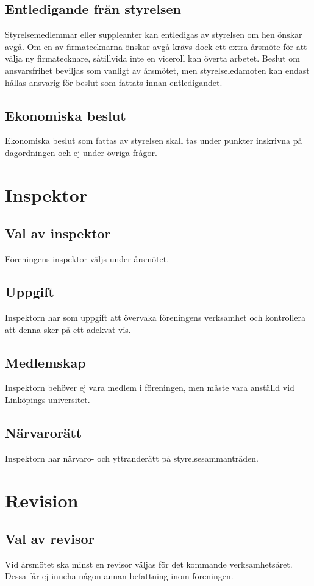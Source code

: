 \documentclass[11pt,a4paper]{article}
\begin{document}
\subsection{Entledigande från styrelsen}
Styrelsemedlemmar eller suppleanter kan entledigas av styrelsen om hen önskar avgå. Om en av firmatecknarna önskar avgå krävs dock ett extra årsmöte för att välja ny firmatecknare, såtillvida inte en viceroll kan överta arbetet. Beslut om ansvarsfrihet beviljas som vanligt av årsmötet, men styrelseledamoten kan endast hållas ansvarig för beslut som fattats innan entledigandet.
\subsection{Ekonomiska beslut}
Ekonomiska beslut som fattas av styrelsen skall tas under punkter
inskrivna på dagordningen och ej under övriga frågor.

\section{Inspektor}

\subsection{Val av inspektor}
Föreningens inspektor väljs under årsmötet.
\subsection{Uppgift}
Inspektorn har som uppgift att övervaka föreningens verksamhet och kontrollera att denna sker på ett adekvat vis.\subsection{Medlemskap}
Inspektorn behöver ej vara medlem i föreningen, men måste vara anställd vid Linköpings universitet.
\subsection{Närvarorätt}
Inspektorn har närvaro- och yttranderätt på styrelsesammanträden.


\section{Revision}

\subsection{Val av revisor}
Vid årsmötet ska minst en revisor väljas för det kommande verksamhetsåret. Dessa får ej inneha någon annan befattning inom föreningen.
\end{document}

